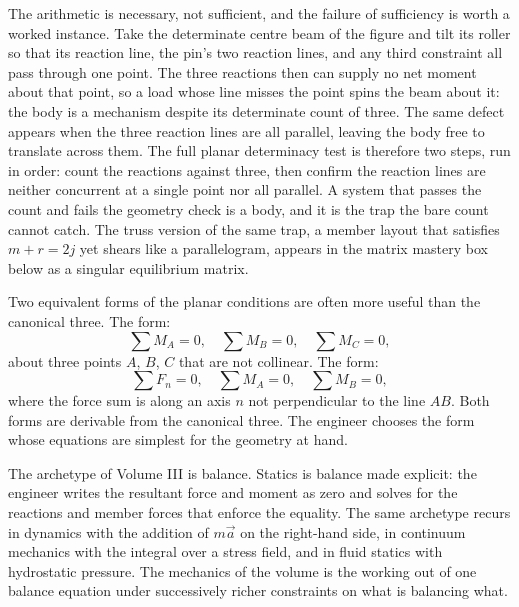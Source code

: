 

The arithmetic is necessary, not sufficient, and the failure of
sufficiency is worth a worked instance. Take the determinate centre beam
of the figure and tilt its roller so that its reaction line, the pin's
two reaction lines, and any third constraint all pass through one point.
The three reactions then can supply no net moment about that point, so a
load whose line misses the point spins the beam about it: the body is a
mechanism despite its determinate count of three. The same defect appears
when the three reaction lines are all parallel, leaving the body free to
translate across them. The full planar determinacy test is therefore two
steps, run in order: count the reactions against three, then confirm the
reaction lines are neither concurrent at a single point nor all parallel.
A system that passes the count and fails the geometry check is a
 body, and it is the trap the bare count
cannot catch. The truss version of the same trap, a member layout that
satisfies $m + r = 2j$ yet shears like a parallelogram, appears in the
matrix mastery box below as a singular equilibrium matrix.

Two equivalent forms of the planar conditions are often more useful
than the canonical three. The  form:
\[
\sum M_A = 0, \quad \sum M_B = 0, \quad \sum M_C = 0,
\]
about three points $A$, $B$, $C$ that are not collinear. The
 form:
\[
\sum F_n = 0, \quad \sum M_A = 0, \quad \sum M_B = 0,
\]
where the force sum is along an axis $n$ not perpendicular to the
line $AB$. Both forms are derivable from the canonical three. The
engineer chooses the form whose equations are simplest for the
geometry at hand.

\begin{archetype}[Balance]
The archetype of Volume III is balance. Statics is balance made
explicit: the engineer writes the resultant force and moment as
zero and solves for the reactions and member forces that enforce
the equality. The same archetype recurs in dynamics with the
addition of $m\vec{a}$ on the right-hand side, in continuum
mechanics with the integral over a stress field, and in fluid
statics with hydrostatic pressure. The mechanics of the volume is
the working out of one balance equation under successively richer
constraints on what is balancing what.
\end{archetype}

